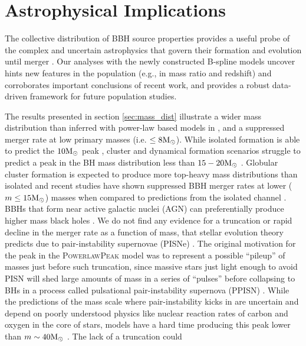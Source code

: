 \section{Astrophysical Implications}\label{sec:astrodiscussion}

The collective distribution of BBH source properties provides a useful probe of the complex and uncertain astrophysics that govern their 
formation and evolution until merger \citep{Rodriguez_2016,Farr2017Nature,Zevin_2017}. Our analyses with the newly constructed B-spline models uncover hints new features in the population (e.g., in mass ratio and redshift) and corroborates important 
conclusions of recent work, and provides a robust data-driven framework for future population studies. 


The results presented in section \ref{sec:mass_dist} illustrate a wider mass distribution than inferred with power-law based models in \citet{o3b_astro_dist}, and a suppressed merger rate 
at low primary masses (i.e. $\leq8{\rm M}_\odot$). While isolated formation is able to predict the $10{\rm M}_\odot$ peak \citep{Antonini_2020}, cluster and dynamical formation scenarios struggle to predict 
a peak in the BH mass distribution less than $15-20{\rm M}_\odot$ \citep{Hong_2018, Rodriguez_2019}. Globular cluster formation is expected to produce more top-heavy mass distributions than isolated 
and recent studies have shown suppressed BBH merger rates at lower ($m\leq15{\rm M}_\odot$) masses when compared to predictions from the isolated channel \citep{Rodriguez_2015, Rodriguez_2019, BaveraMassTransfer,Belczynski_2016}. 
BBHs that form near active galactic nuclei (AGN) can preferentially produce higher mass black holes \citep{FordAGN, Tagawa_2021, Yang_2019}. 
We do not find any evidence for a truncation or rapid decline in the merger rate as a function of mass, that stellar evolution theory predicts due to pair-instability supernovae (PISNe) \citep{Heger_2002,PISN_Woosley,Heger_2003,Spera_2017}. The original motivation for the peak in the \textsc{PowerlawPeak} model \citep{Talbot_2018} was to represent a possible ``pileup'' of 
masses just before such truncation, since massive stars just light enough to avoid PISN will shed large amounts of mass in a series of ``pulses'' before collapsing to BHs in a process called 
pulsational pair-instability supernova (PPISN) \citep{Woosley_2017,Woosley_2019,Farmer_2019}. While the predictions of the mass scale where pair-instability kicks in are uncertain and depend on poorly understood physics 
like nuclear reaction rates of carbon and oxygen in the core of stars, models have a hard time producing this peak lower than $m\sim40{\rm M}_\odot$ \citep{Belczynski_2016,Marchant_2019,Renzo_2020,Farmer_2019,Farmer_2020}. The lack of a truncation could 
